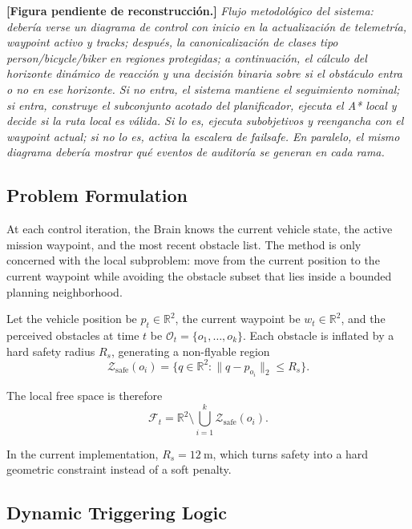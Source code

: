 \documentclass[a4paper,11pt]{article}
\newcommand{\diagramplaceholder}[1]{\par\smallskip\noindent\textbf{[Figura pendiente de reconstrucción.] } \emph{#1}\par\smallskip}
\begin{document}
\diagramplaceholder{Flujo metodológico del sistema: debería verse un diagrama de control con inicio en la actualización de telemetría, waypoint activo y tracks; después, la canonicalización de clases tipo person/bicycle/biker en regiones protegidas; a continuación, el cálculo del horizonte dinámico de reacción y una decisión binaria sobre si el obstáculo entra o no en ese horizonte. Si no entra, el sistema mantiene el seguimiento nominal; si entra, construye el subconjunto acotado del planificador, ejecuta el A* local y decide si la ruta local es válida. Si lo es, ejecuta subobjetivos y reengancha con el waypoint actual; si no lo es, activa la escalera de failsafe. En paralelo, el mismo diagrama debería mostrar qué eventos de auditoría se generan en cada rama.}

\subsection{Problem Formulation}

At each control iteration, the Brain knows the current vehicle state, the active mission waypoint, and the most recent obstacle list. The method is only concerned with the local subproblem: move from the current position to the current waypoint while avoiding the obstacle subset that lies inside a bounded planning neighborhood.

Let the vehicle position be \(p_t \in \mathbb{R}^2\), the current waypoint be \(w_t \in \mathbb{R}^2\), and the perceived obstacles at time \(t\) be \(\mathcal{O}_t = \{o_1,\dots,o_k\}\). Each obstacle is inflated by a hard safety radius \(R_s\), generating a non-flyable region
\begin{equation}
    \mathcal{Z}_{\mathrm{safe}}(o_i) = \{q \in \mathbb{R}^2 : \lVert q - p_{o_i} \rVert_2 \le R_s\}.
\end{equation}

The local free space is therefore
\begin{equation}
    \mathcal{F}_t = \mathbb{R}^2 \setminus \bigcup_{i=1}^{k} \mathcal{Z}_{\mathrm{safe}}(o_i).
\end{equation}

In the current implementation, \(R_s = \SI{12}{\meter}\), which turns safety into a hard geometric constraint instead of a soft penalty.

\subsection{Dynamic Triggering Logic}
\end{document}
